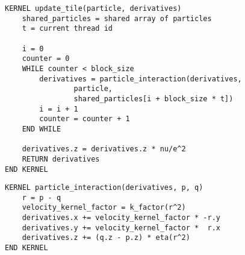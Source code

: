 \begin{verbatim}
KERNEL update_tile(particle, derivatives)
    shared_particles = shared array of particles
    t = current thread id

    i = 0
    counter = 0
    WHILE counter < block_size
        derivatives = particle_interaction(derivatives,
                particle,
                shared_particles[i + block_size * t])
        i = i + 1
        counter = counter + 1
    END WHILE

    derivatives.z = derivatives.z * nu/e^2
    RETURN derivatives
END KERNEL
\end{verbatim}

\begin{verbatim}
KERNEL particle_interaction(derivatives, p, q)
    r = p - q
    velocity_kernel_factor = k_factor(r^2)
    derivatives.x += velocity_kernel_factor * -r.y
    derivatives.y += velocity_kernel_factor *  r.x
    derivatives.z += (q.z - p.z) * eta(r^2)
END KERNEL
\end{verbatim}
